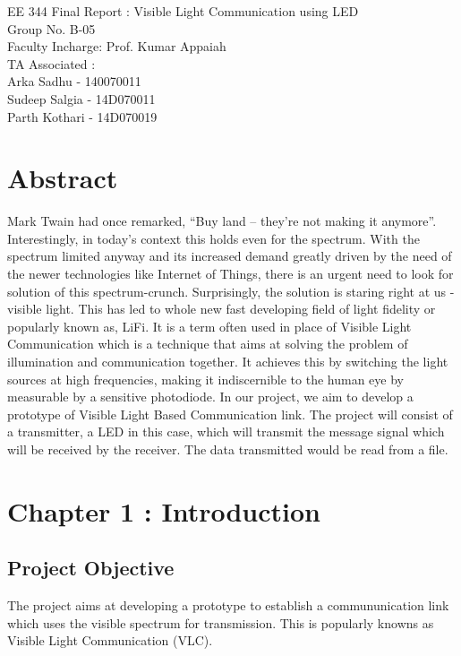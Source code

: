\documentclass{article}
\begin{document}

EE 344 Final Report : Visible Light Communication using LED\\
Group No. B-05\\
Faculty Incharge: Prof. Kumar Appaiah\\
TA Associated : \\
Arka Sadhu - 140070011\\
Sudeep Salgia - 14D070011\\
Parth Kothari - 14D070019\\

\section{Abstract}
Mark Twain had once remarked, “Buy land -- they’re not making it anymore”. Interestingly, in today’s context this holds even for the spectrum. With the spectrum limited anyway and its increased demand greatly driven by the need of the newer technologies like Internet of Things, there is an urgent need to look for solution of this spectrum-crunch. Surprisingly, the solution is staring right at us - visible light. This has led to whole new fast developing field of light fidelity or popularly known as, LiFi. It is a term often used in place of Visible Light Communication which is a technique that aims at solving the problem of illumination and communication together. It achieves this by switching the light sources at high frequencies, making it indiscernible to the human eye by measurable by a sensitive photodiode.
In our project, we aim to develop a prototype of Visible Light Based Communication link. The
project will consist of a transmitter, a LED in this case, which will transmit the message signal
which will be received by the receiver. The data transmitted would be read from a file.
\newpage
\tableofcontents
\newpage
\section{Chapter 1 : Introduction}
\subsection{Project Objective}
The project aims at developing a prototype to establish a commununication link which uses the visible spectrum for transmission. This is popularly knowns as Visible Light Communication (VLC).  
\end{document}
